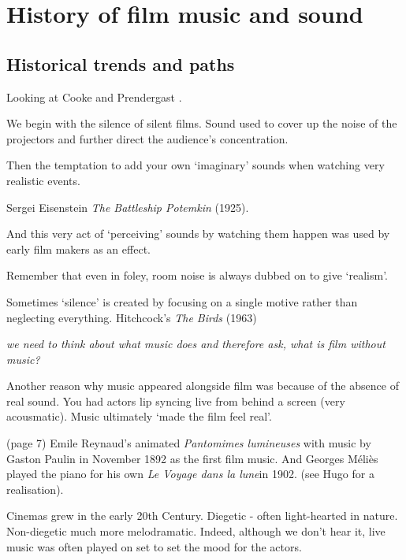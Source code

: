 
\chapter{History of film music and sound}
\label{history}

\section{Historical trends and paths}
Looking at Cooke \citeyearpar{cooke2008history} and Prendergast \citeyearpar{prendergast1992film}.

We  begin with the silence of silent films.  
Sound used to cover up the noise of the projectors and further direct the audience's concentration.

Then the temptation to add your own `imaginary' sounds when watching very realistic events. 

Sergei Eisenstein \textit{The Battleship Potemkin} (1925). 

And this very act of `perceiving' sounds by watching them happen was used by early film makers as an effect. 

Remember that even in foley, room noise is always dubbed on to give `realism'.

Sometimes `silence' is created by focusing on a single motive rather than neglecting everything. Hitchcock's \textit{The Birds} (1963) 

\textit{we need to think about what music does and therefore ask, what is film without music?}

Another reason why music appeared alongside film was because of the absence of real sound. You had actors lip syncing live from behind a screen (very acousmatic). Music ultimately `made the film feel real'. 

(page 7) Emile Reynaud's animated \textit{Pantomimes lumineuses} with music by Gaston Paulin in November 1892 as the first film music. And Georges M\'eli\`es played the piano for his own \textit{Le Voyage dans la lune}in 1902. (see Hugo for a realisation). 

Cinemas grew in the early 20th Century. 
Diegetic - often light-hearted in nature. Non-diegetic much more melodramatic. Indeed, although we don't hear it, live music was often played on set to set the mood for the actors.  

